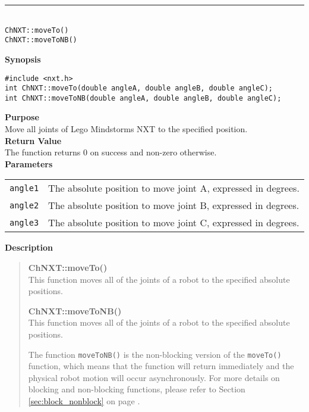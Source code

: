 \noindent
\vspace{5pt}
\rule{4.5in}{0.015in}\\
\noindent
{\LARGE \texttt{ChNXT::moveTo()} }\\
{\LARGE \texttt{ChNXT::moveToNB()} }\\


\noindent
{\bf Synopsis}
\begin{lstlisting}
#include <nxt.h>
int ChNXT::moveTo(double angleA, double angleB, double angleC);
int ChNXT::moveToNB(double angleA, double angleB, double angleC);
\end{lstlisting}

\noindent
{\bf Purpose}\\
Move all joints of Lego Mindstorms NXT to the specified position.\\

\noindent
{\bf Return Value}\\
The function returns 0 on success and non-zero otherwise.\\

\noindent
{\bf Parameters}\\
\vspace{-0.1in}
\begin{description}
\item               
\begin{tabular}{p{15 mm}p{105 mm}}
\texttt{angle1} & The absolute position to move joint A, expressed in degrees. \\
\texttt{angle2} & The absolute position to move joint B, expressed in degrees. \\
\texttt{angle3} & The absolute position to move joint C, expressed in degrees. \\
\end{tabular}
\end{description}

\noindent
{\bf Description}\\
\vspace{-12pt}
\begin{quote}
{\bf ChNXT::moveTo()}\\
This function moves all of the joints of a robot to the specified 
absolute positions. 

{\bf ChNXT::moveToNB()}\\
This function moves all of the joints of a robot to the specified 
absolute positions. 

The function \texttt{moveToNB()} is the non-blocking version of
the \texttt{moveTo()} function, which means that the function will
return immediately and the physical robot motion will occur 
asynchronously. For more details on blocking and non-blocking 
functions, please refer to Section \ref{sec:block_nonblock} on page 
\pageref{sec:block_nonblock}.\\
\end{quote}

